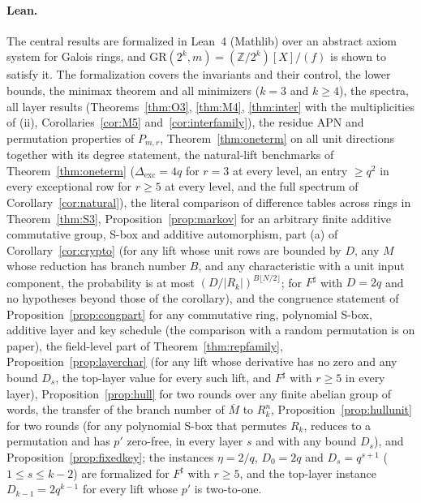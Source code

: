 \documentclass[11pt]{article}
\theoremstyle{definition}
\theoremstyle{remark}
\newcommand{\Z}{\mathbb{Z}}
\newcommand{\GR}{\mathrm{GR}}
\newcommand{\ol}[1]{\overline{#1}}
\newcommand{\Dexc}{\Delta_{\mathrm{exc}}}
\begin{document}
\paragraph{Lean.}
The central results are formalized in Lean~4 (Mathlib) over an abstract axiom system for Galois rings, and
$\GR(2^k,m)=(\Z/2^k)[X]/(f)$ is shown to satisfy it. The formalization covers the invariants and their control,
the lower bounds, the minimax theorem and all minimizers ($k=3$ and $k\ge4$), the spectra, all layer results
(Theorems~\ref{thm:O3}, \ref{thm:M4}, \ref{thm:inter} with the multiplicities of (ii), Corollaries~\ref{cor:M5}
and~\ref{cor:interfamily}), the
residue APN and permutation properties of $P_{m,r}$, Theorem~\ref{thm:oneterm} on all unit directions together with
its degree statement, the natural-lift benchmarks of Theorem~\ref{thm:oneterm} ($\Dexc=4q$ for $r=3$ at every level,
an entry $\ge q^2$ in every exceptional row for $r\ge5$ at every level, and the full spectrum of
Corollary~\ref{cor:natural}), the literal comparison of difference tables across rings in Theorem~\ref{thm:S3},
Proposition~\ref{prop:markov} for an arbitrary finite additive commutative group, S-box and additive automorphism,
part (a) of Corollary~\ref{cor:crypto} (for any lift whose unit rows are bounded by $D$, any $M$ whose reduction has
branch number $B$, and any characteristic with a unit input component, the probability is at most
$(D/|R_k|)^{B\lfloor N/2\rfloor}$; for $F^\sharp$ with $D=2q$ and no hypotheses beyond those of the corollary), and the congruence statement of
Proposition~\ref{prop:congpart} for any commutative ring, polynomial S-box, additive layer and key schedule (the
comparison with a random permutation is on paper), the field-level part of Theorem~\ref{thm:repfamily},
Proposition~\ref{prop:layerchar} (for any lift whose derivative has no zero and any bound $D_s$, the top-layer value for
every such lift, and $F^\sharp$ with $r\ge5$ in every layer), Proposition~\ref{prop:hull} for two rounds over any finite
abelian group of words, the transfer of the branch number of $\ol M$ to $R_k^n$, Proposition~\ref{prop:hullunit} for two
rounds (for any polynomial S-box that permutes $R_k$, reduces to a permutation and has $p'$ zero-free, in every layer
$s$ and with any bound $D_s$), and Proposition~\ref{prop:fixedkey}; the instances $\eta=2/q$, $D_0=2q$ and
$D_s=q^{s+1}$ ($1\le s\le k-2$) are formalized for $F^\sharp$ with $r\ge5$, and the top-layer instance
$D_{k-1}=2q^{k-1}$ for every lift whose $p'$ is two-to-one.
\end{document}
